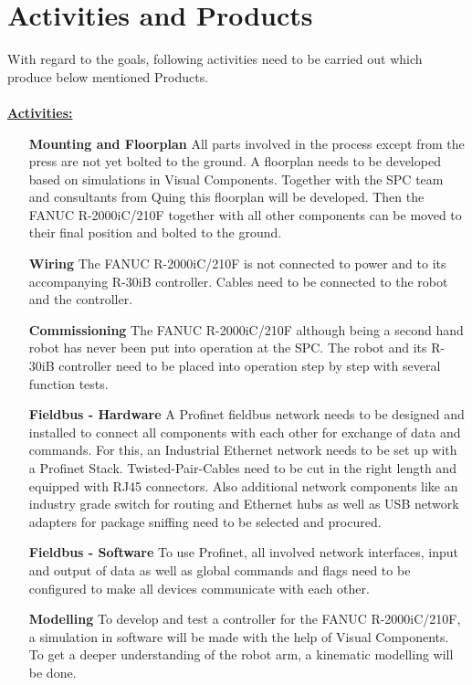 
\chapter{Activities and Products}


With regard to the goals, following activities need to be carried out which produce below mentioned Products.\\
\\
\underline{\textbf{Activities:}}\vspace{2mm}
\begin{itemize}[leftmargin=5cm]
	\item[\textbf{Mounting and Floorplan}] All parts involved in the process except from the press are not yet bolted to the ground. A floorplan needs to be developed based on simulations in Visual Components. Together with the SPC team and consultants from Quing this floorplan will be developed. Then the FANUC R-2000iC/210F together with all other components can be moved to their final position and bolted to the ground.
	\item[\textbf{Wiring}] The FANUC R-2000iC/210F is not connected to power and to its accompanying R-30iB controller. Cables need to be connected to the robot and the controller.
	\item[\textbf{Commissioning}] The FANUC R-2000iC/210F although being a second hand robot has never been put into operation at the SPC. The robot and its R-30iB controller need to  be placed into operation step by step with several function tests.
	\item[\textbf{Fieldbus - Hardware}] A Profinet fieldbus network needs to be designed and installed to connect all components with each other for exchange of data and commands. For this, an Industrial Ethernet network needs to be set up with a Profinet Stack. Twisted-Pair-Cables need to be cut in the right length and equipped with RJ45 connectors. Also additional network components like an industry grade switch for routing and Ethernet hubs as well as USB network adapters for package sniffing need  to be selected and procured. 
	\item[\textbf{Fieldbus - Software}] To use Profinet, all involved network interfaces, input and output of data as well as global commands and flags need to be configured to make all devices communicate with each other.   
	\item[\textbf{Modelling}] To develop and test a controller for the FANUC R-2000iC/210F, a simulation in software will be made with the help of Visual Components. To get a deeper understanding of the robot arm, a kinematic modelling will be done.

\end{itemize}
